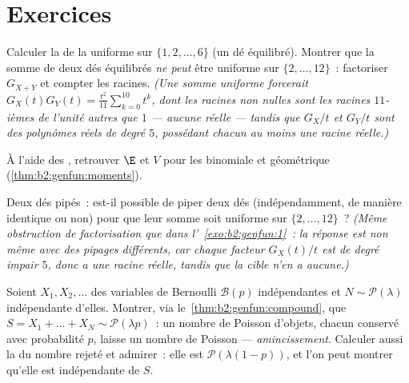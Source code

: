 \section{Exercices}

\begin{exercise}[$\star$]\label{exo:b2:genfun:1}
Calculer la  de la  uniforme sur $\{1, 2,
\dots, 6\}$ (un dé équilibré). Montrer que la somme de deux dés
équilibrés \emph{ne peut} être uniforme sur $\{2, \dots, 12\}$~:
factoriser $G_{X+Y}$ et compter les racines. \emph{(Une somme uniforme
forcerait $G_X(t)G_Y(t) =
\frac{t^2}{11}\sum_{k=0}^{10}t^k$, dont les racines non nulles sont les
racines $11$-ièmes de l'unité autres que $1$ --- aucune réelle ---
tandis que $G_X/t$ et $G_Y/t$ sont des polynômes réels de degré $5$,
possédant chacun au moins une racine réelle.)}
\end{exercise}

\begin{exercise}[$\star$]\label{exo:b2:genfun:2}
À l'aide des , retrouver $\E$ et $V$ pour les
 binomiale et géométrique (\cref{thm:b2:genfun:moments}).
\end{exercise}

\begin{exercise}[$\star$]\label{exo:b2:genfun:3}
Deux dés pipés~: est-il possible de piper deux dés (indépendamment,
de manière identique ou non) pour que leur somme soit uniforme sur
$\{2, \dots, 12\}$~? \emph{(Même obstruction de factorisation que dans
l'~\cref{exo:b2:genfun:1}~: la réponse est non même avec des pipages
différents, car chaque facteur $G_X(t)/t$ est de degré impair $5$,
donc a une racine réelle, tandis que la cible n'en a aucune.)}
\end{exercise}

\begin{exercise}[$\star\star$]\label{exo:b2:genfun:4}
Soient $X_1, X_2, \dots$ des variables de Bernoulli $\mathcal{B}(p)$
indépendantes et $N \sim \mathcal{P}(\lambda)$ indépendante d'elles.
Montrer, via le~\cref{thm:b2:genfun:compound}, que $S = X_1 + \dots + X_N
\sim \mathcal{P}(\lambda p)$~: un nombre de Poisson d'objets, chacun
conservé avec probabilité $p$, laisse un nombre de Poisson ---
\emph{amincissement}. Calculer aussi la  du nombre rejeté et
admirer~: elle est $\mathcal{P}(\lambda(1-p))$, et l'on peut montrer
qu'elle est indépendante de $S$.
\end{exercise}


